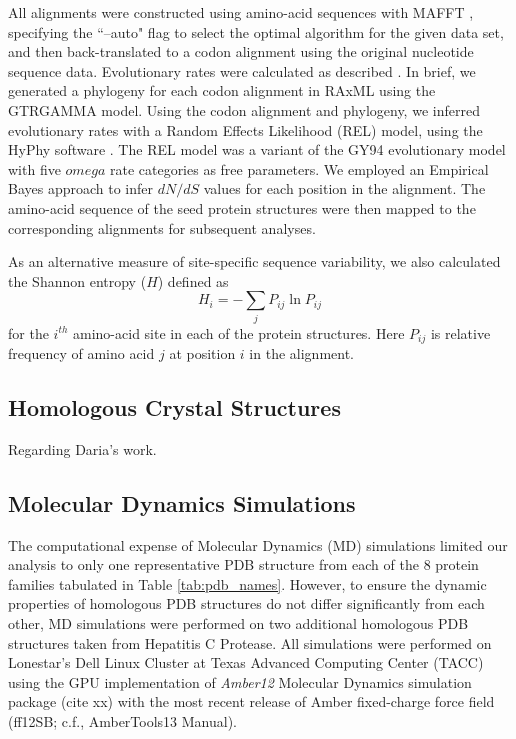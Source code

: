 \documentclass[12pt]{article}
\begin{document}
All alignments were constructed using amino-acid sequences with MAFFT \citep{Katohetal2002,Katohetal2005}, specifying the ``--auto" flag to select the optimal algorithm for the given data set, and then back-translated to a codon alignment using the original nucleotide sequence data. Evolutionary rates were calculated as described \citep{SpielmanWilke2013}. In brief, we generated a phylogeny for each codon alignment in RAxML \citep{RaxMLHPC} using the GTRGAMMA model. Using the codon alignment and phylogeny, we inferred evolutionary rates with a Random Effects Likelihood (REL) model, using the HyPhy software \citep{KosakovskyPondetal2005}. The REL model was a variant of the GY94 evolutionary model \citep{GoldmanYang1994} with five $omega$ rate categories as free parameters. We employed an Empirical Bayes approach \citep{Yang2000} to infer $dN/dS$ values for each position in the alignment. The amino-acid sequence of the seed protein structures were then mapped to the corresponding alignments for subsequent analyses.

As an alternative measure of site-specific sequence variability, we also calculated the Shannon entropy ($H$) defined as
\begin{equation}
        H_i = - \sum_jP_{ij}\ln P_{ij}
\end{equation}
for the $i^{th}$ amino-acid site in each of the protein structures. Here $P_{ij}$ is relative frequency of amino acid $j$ at position $i$ in the alignment.


\subsection*{Homologous Crystal Structures}

        Regarding Daria's work.

\subsection*{Molecular Dynamics Simulations}

The computational expense of Molecular Dynamics (MD) simulations limited our analysis to only one representative PDB structure from each of the $8$ protein families tabulated in Table \ref{tab:pdb_names}. However, to ensure the dynamic properties of homologous PDB structures do not differ significantly from each other, MD simulations were performed on two additional homologous PDB structures taken from Hepatitis C Protease. All simulations were performed on Lonestar's Dell Linux Cluster at Texas Advanced Computing Center (TACC) using the GPU implementation of {\it Amber12} Molecular Dynamics simulation package (cite xx) with the most recent release of Amber fixed-charge force field (ff12SB; c.f., AmberTools13 Manual).
		
\end{document}
